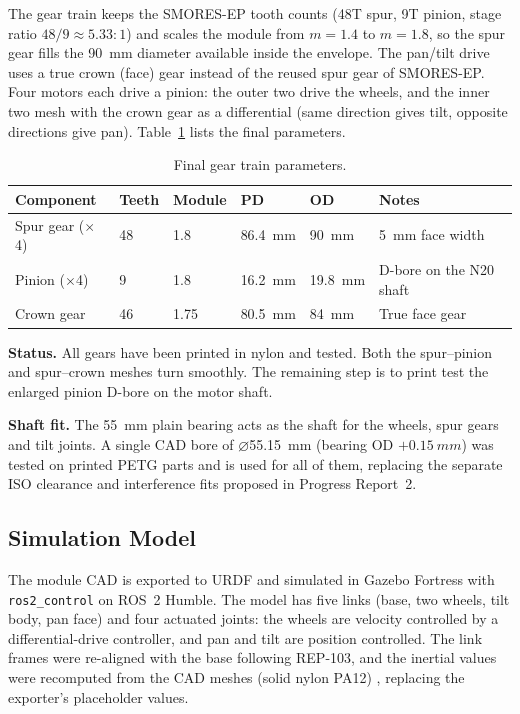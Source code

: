 \documentclass[12pt,a4paper]{article}
\begin{document}
The gear train keeps the SMORES-EP tooth counts (48T spur, 9T pinion, stage ratio $48/9 \approx 5.33{:}1$) and scales the module from $m = 1.4$ to $m = 1.8$, so the spur gear fills the \SI{90}{mm} diameter available inside the envelope. The pan/tilt drive uses a true crown (face) gear instead of the reused spur gear of SMORES-EP. Four motors each drive a pinion: the outer two drive the wheels, and the inner two mesh with the crown gear as a differential (same direction gives tilt, opposite directions give pan). Table~\ref{tab:final-params} lists the final parameters.

\begin{table}[H]
	\centering\small
	\caption{Final gear train parameters.}
	\label{tab:final-params}
	\begin{tabular}{lllllp{4.2cm}}
		\toprule
		\textbf{Component} & \textbf{Teeth} & \textbf{Module} & \textbf{PD} & \textbf{OD} & \textbf{Notes} \\
		\midrule
		Spur gear ($\times$4) & 48 & \num{1.8} & \SI{86.4}{mm} & \SI{90}{mm} &
		\SI{5}{mm} face width \\
		\addlinespace
		Pinion ($\times$4) & 9 & \num{1.8} & \SI{16.2}{mm} & \SI{19.8}{mm} &
		D-bore on the N20 shaft \\
		\addlinespace
		Crown gear & 46 & \num{1.75} & \SI{80.5}{mm} & \SI{84}{mm} &
		True face gear \\
		\bottomrule
	\end{tabular}
\end{table}

\textbf{Status.} All gears have been printed in nylon and tested. Both the spur--pinion and spur--crown meshes turn smoothly. The remaining step is to print test the enlarged pinion D-bore on the motor shaft.

\textbf{Shaft fit.} The \SI{55}{mm} plain bearing acts as the shaft for the wheels, spur gears and tilt joints. A single CAD bore of $\varnothing$\SI{55.15}{mm} (bearing OD $+\SI{0.15}{mm}$) was tested on printed PETG parts and is used for all of them, replacing the separate ISO clearance and interference fits proposed in Progress Report~2.

\subsection{Simulation Model}
\label{sec:sim-model}

The module CAD is exported to URDF and simulated in Gazebo Fortress with \texttt{ros2\_control} on ROS~2 Humble. The model has five links (base, two wheels, tilt body, pan face) and four actuated joints: the wheels are velocity controlled by a differential-drive controller, and pan and tilt are position controlled. The link frames were re-aligned with the base following REP-103, and the inertial values were recomputed from the CAD meshes (solid nylon PA12) \cite{mirtich1996}, replacing the exporter's placeholder values.
\end{document}
